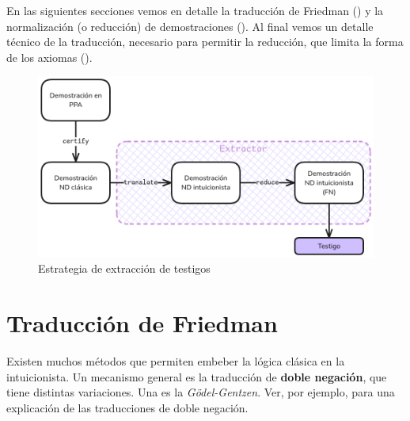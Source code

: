 En las siguientes secciones vemos en detalle la traducción de Friedman
() y la normalización (o reducción) de demostraciones (). Al final vemos un detalle técnico de la traducción, necesario para permitir la reducción, que limita la forma de los axiomas ().

\begin{figure}
    \includegraphics[scale=0.35]{img/fri-extract-strategy.png}
    \centering
    \caption{Estrategia de extracción de testigos}
    \label{fri:fig:strat}
\end{figure}

\section{Traducción de Friedman}
\label{fri:sec:fri}

Existen muchos métodos que permiten embeber la lógica clásica en la
intuicionista. Un mecanismo general es la traducción de
\textbf{doble negación}, que tiene distintas variaciones. Una es la
\textit{Gödel-Gentzen}. Ver, por ejemplo, \cite{Avigad1998-FEFOFD} para una explicación de las traducciones de doble negación.

